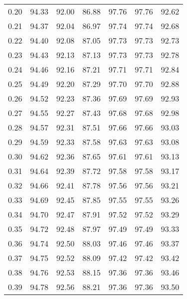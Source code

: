 \begin{tabular}{|c|c|c|c|c|c|c|}
      0.20 &     94.33 &     92.00 &      86.88 &   97.76 &      97.76 &         92.62 \\
      0.21 &     94.37 &     92.04 &      86.97 &   97.74 &      97.74 &         92.68 \\
      0.22 &     94.40 &     92.08 &      87.05 &   97.73 &      97.73 &         92.73 \\
      0.23 &     94.43 &     92.13 &      87.13 &   97.73 &      97.73 &         92.78 \\
      0.24 &     94.46 &     92.16 &      87.21 &   97.71 &      97.71 &         92.84 \\
      0.25 &     94.49 &     92.20 &      87.29 &   97.70 &      97.70 &         92.88 \\
      0.26 &     94.52 &     92.23 &      87.36 &   97.69 &      97.69 &         92.93 \\
      0.27 &     94.55 &     92.27 &      87.43 &   97.68 &      97.68 &         92.98 \\
      0.28 &     94.57 &     92.31 &      87.51 &   97.66 &      97.66 &         93.03 \\
      0.29 &     94.59 &     92.33 &      87.58 &   97.63 &      97.63 &         93.08 \\
      0.30 &     94.62 &     92.36 &      87.65 &   97.61 &      97.61 &         93.13 \\
      0.31 &     94.64 &     92.39 &      87.72 &   97.58 &      97.58 &         93.17 \\
      0.32 &     94.66 &     92.41 &      87.78 &   97.56 &      97.56 &         93.21 \\
      0.33 &     94.69 &     92.45 &      87.85 &   97.55 &      97.55 &         93.26 \\
      0.34 &     94.70 &     92.47 &      87.91 &   97.52 &      97.52 &         93.29 \\
      0.35 &     94.72 &     92.48 &      87.97 &   97.49 &      97.49 &         93.33 \\
      0.36 &     94.74 &     92.50 &      88.03 &   97.46 &      97.46 &         93.37 \\
      0.37 &     94.75 &     92.52 &      88.09 &   97.42 &      97.42 &         93.42 \\
      0.38 &     94.76 &     92.53 &      88.15 &   97.36 &      97.36 &         93.46 \\
      0.39 &     94.78 &     92.56 &      88.21 &   97.36 &      97.36 &         93.50 \\

\end{tabular}
